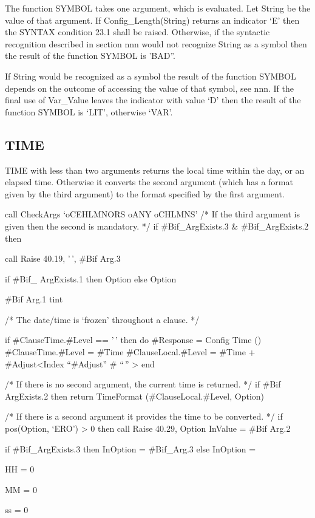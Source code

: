 The function SYMBOL takes one argument, which is evaluated. Let String
be the value of that argument. If Config\_Length(String) returns an
indicator `E' then the SYNTAX condition 23.1 shall be raised. Otherwise,
if the syntactic recognition described in section nnn would not
recognize String as a symbol then the result of the function SYMBOL is
'BAD''.

If String would be recognized as a symbol the result of the function
SYMBOL depends on the outcome of accessing the value of that symbol, see
nnn. If the final use of Var\_Value leaves the indicator with value `D'
then the result of the function SYMBOL is `LIT', otherwise `VAR'.

\subsection{TIME}\label{time}

TIME with less than two arguments returns the local time within the day,
or an elapsed time. Otherwise it converts the second argument (which has
a format given by the third argument) to the format specified by the
first argument.

call CheckArgs `oCEHLMNORS oANY oCHLMNS' /* If the third argument is
given then the second is mandatory. */ if \#Bif\_ArgExists.3 \&
\#Bif\_ArgExists.2 then

call Raise 40.19, '\,', \#Bif Arg.3

if \#Bif\_ ArgExists.1 then Option else Option

\#Bif Arg.1 tint

/* The date/time is `frozen' throughout a clause. */

if \#ClauseTime.\#Level == '\,' then do \#Response = Config Time ()
\#ClauseTime.\#Level = \#Time \#ClauseLocal.\#Level = \#Time +
\#Adjust\textless Index ``\#Adjust'' \# ``\,'' \textgreater{} end

/* If there is no second argument, the current time is returned. */ if
\#Bif ArgExists.2 then return TimeFormat (\#ClauseLocal.\#Level, Option)

/* If there is a second argument it provides the time to be converted.
*/ if pos(Option, `ERO') \textgreater{} 0 then call Raise 40.29, Option
InValue = \#Bif Arg.2

if \#Bif\_ArgExists.3 then InOption = \#Bif\_Arg.3 else InOption =

HH = 0

MM = 0

ss = 0

